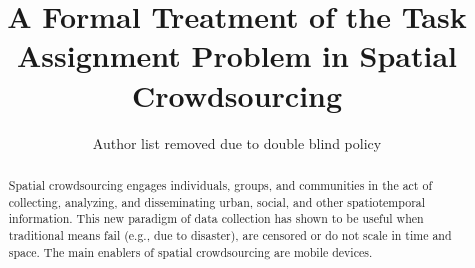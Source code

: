 \documentclass{sig-alternate}
\title{A Formal Treatment of the Task Assignment Problem in Spatial Crowdsourcing}
\begin{document}
\author{Author list removed due to double blind policy}

\maketitle
\begin{abstract}
Spatial crowdsourcing engages individuals, groups, and communities in the act of collecting, analyzing, and disseminating urban, social, and other spatiotemporal information. This new paradigm of data collection has shown to be useful when traditional means fail (e.g., due to disaster), are censored or do not scale in time and space.  The main enablers of spatial crowdsourcing are mobile devices. 





\end{abstract}
\end{document}
